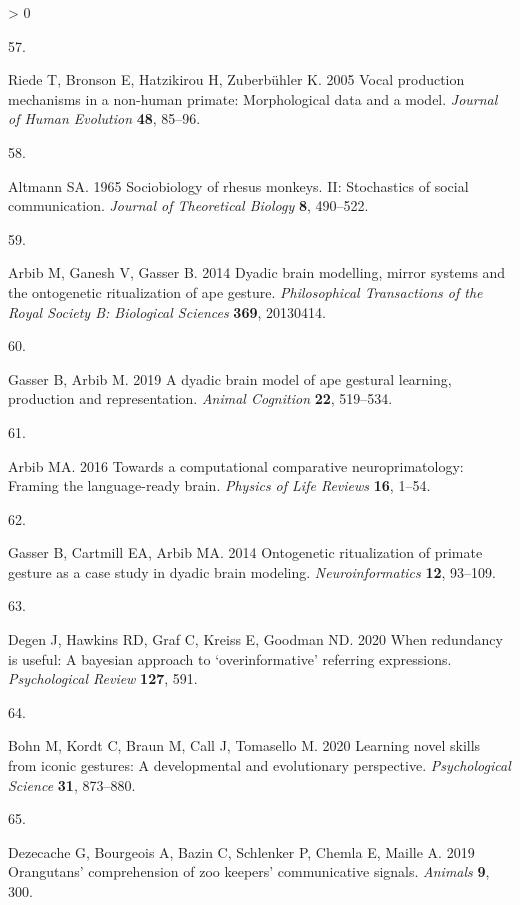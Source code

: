 \documentclass[
  english,
  man,floatsintext]{apa6}
\newlength{\cslhangindent}
\newlength{\csllabelwidth}
\newenvironment{CSLReferences}[2] %
 {%
  \setlength{\parindent}{0pt}
  \ifodd #1 \everypar{\setlength{\hangindent}{\cslhangindent}}\ignorespaces\fi
  \ifnum #2 > 0
  \setlength{\parskip}{#2\baselineskip}
  \fi
 }%
 {}
\newcommand{\CSLLeftMargin}[1]{\parbox[t]{\csllabelwidth}{#1}}
\newcommand{\CSLRightInline}[1]{\parbox[t]{\linewidth - \csllabelwidth}{#1}\break}
\begin{document}
\begin{CSLReferences}{0}{0}
\leavevmode\hypertarget{ref-riede2005vocal}{}%
\CSLLeftMargin{57. }
\CSLRightInline{Riede T, Bronson E, Hatzikirou H, Zuberbühler K. 2005 Vocal production mechanisms in a non-human primate: Morphological data and a model. \emph{Journal of Human Evolution} \textbf{48}, 85--96.}

\leavevmode\hypertarget{ref-altmann1965sociobiology}{}%
\CSLLeftMargin{58. }
\CSLRightInline{Altmann SA. 1965 Sociobiology of rhesus monkeys. II: Stochastics of social communication. \emph{Journal of Theoretical Biology} \textbf{8}, 490--522.}

\leavevmode\hypertarget{ref-arbib2014dyadic}{}%
\CSLLeftMargin{59. }
\CSLRightInline{Arbib M, Ganesh V, Gasser B. 2014 Dyadic brain modelling, mirror systems and the ontogenetic ritualization of ape gesture. \emph{Philosophical Transactions of the Royal Society B: Biological Sciences} \textbf{369}, 20130414.}

\leavevmode\hypertarget{ref-gasser2019dyadic}{}%
\CSLLeftMargin{60. }
\CSLRightInline{Gasser B, Arbib M. 2019 A dyadic brain model of ape gestural learning, production and representation. \emph{Animal Cognition} \textbf{22}, 519--534.}

\leavevmode\hypertarget{ref-arbib2016towards}{}%
\CSLLeftMargin{61. }
\CSLRightInline{Arbib MA. 2016 Towards a computational comparative neuroprimatology: Framing the language-ready brain. \emph{Physics of Life Reviews} \textbf{16}, 1--54.}

\leavevmode\hypertarget{ref-gasser2014ontogenetic}{}%
\CSLLeftMargin{62. }
\CSLRightInline{Gasser B, Cartmill EA, Arbib MA. 2014 Ontogenetic ritualization of primate gesture as a case study in dyadic brain modeling. \emph{Neuroinformatics} \textbf{12}, 93--109.}

\leavevmode\hypertarget{ref-degen2020redundancy}{}%
\CSLLeftMargin{63. }
\CSLRightInline{Degen J, Hawkins RD, Graf C, Kreiss E, Goodman ND. 2020 When redundancy is useful: A bayesian approach to {`overinformative'} referring expressions. \emph{Psychological Review} \textbf{127}, 591.}

\leavevmode\hypertarget{ref-bohn2020learning}{}%
\CSLLeftMargin{64. }
\CSLRightInline{Bohn M, Kordt C, Braun M, Call J, Tomasello M. 2020 Learning novel skills from iconic gestures: A developmental and evolutionary perspective. \emph{Psychological Science} \textbf{31}, 873--880.}

\leavevmode\hypertarget{ref-dezecache2019orangutans}{}%
\CSLLeftMargin{65. }
\CSLRightInline{Dezecache G, Bourgeois A, Bazin C, Schlenker P, Chemla E, Maille A. 2019 Orangutans' comprehension of zoo keepers' communicative signals. \emph{Animals} \textbf{9}, 300.}


\end{CSLReferences}
\end{document}
